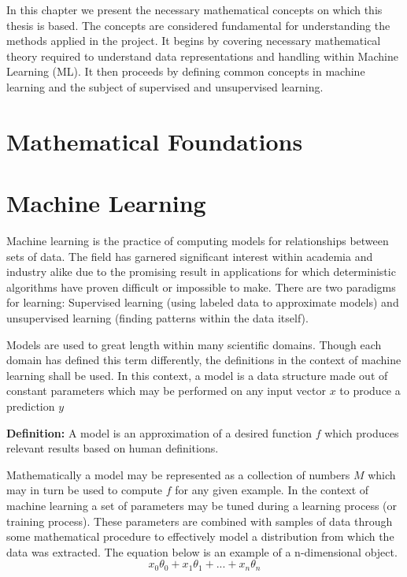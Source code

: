 In this chapter we present the necessary mathematical concepts on which this thesis is based. The concepts are considered fundamental for understanding the methods applied in the project. It begins by 
covering necessary mathematical theory required to understand data representations and handling within Machine Learning (ML). It then proceeds by defining common concepts in machine learning and the subject of supervised and unsupervised learning.


\section{Mathematical Foundations}

\section{Machine Learning}

Machine learning is the practice of computing models for relationships between sets of data. The field has garnered significant interest within academia and industry alike due to the promising result in applications for which deterministic algorithms have proven difficult or impossible to make. There are two paradigms for learning: Supervised learning (using labeled data to approximate models) and unsupervised learning (finding patterns within the data itself). 

Models are used to great length within many scientific domains. Though each domain has defined this term differently, the definitions in the context of machine learning shall be used. In this context, a model is a data structure made out of constant parameters which may be performed on any input vector $x$ to produce a prediction $y$

\vspace{5mm}

\textbf{Definition: } A model is an approximation of a desired function $f$ which produces relevant results based on human definitions.  

\vspace{5mm}

Mathematically a model may be represented as a collection of numbers $M$ which may in turn be used to compute $f$ for any given example.
In the context of machine learning a set of parameters may be tuned during a learning process (or training process). These parameters are combined with samples of data through some mathematical procedure to effectively model a distribution from which the data was extracted. The equation below is an example of a n-dimensional object.
$$x_0\theta_0 + x_1\theta_1 + ... + x_n\theta_n$$

